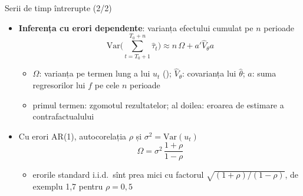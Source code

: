 \begin{frame}{Serii de timp întrerupte (2/2)}
\itemsize{\small}
\begin{itemize}
    \item \textbf{Inferența cu erori dependente}: varianța efectului cumulat pe $n$ perioade \[ \mathrm{Var}\Big(\sum_{t=T_0+1}^{T_0+n}\hat\tau_t\Big) \approx n\,\Omega + a'\hat V_\theta a \]
    \begin{itemize}
        \item $\Omega$: varianța pe termen lung a lui $u_t$ (); $\hat V_\theta$: covarianța lui $\hat\theta$; $a$: suma regresorilor lui $f$ pe cele $n$ perioade
        \item primul termen: zgomotul rezultatelor; al doilea: eroarea de estimare a contrafactualului
    \end{itemize}
    \item Cu erori AR(1), autocorelația $\rho$ și $\sigma^2 = \mathrm{Var}(u_t)$ \[ \Omega = \sigma^2\,\frac{1 + \rho}{1 - \rho} \]
    \begin{itemize}
        \item erorile standard i.i.d.\ sînt prea mici cu factorul $\sqrt{(1 + \rho)/(1 - \rho)}$, de exemplu 1,7 pentru $\rho = 0{,}5$
    \end{itemize}
\end{itemize}
\end{frame}

